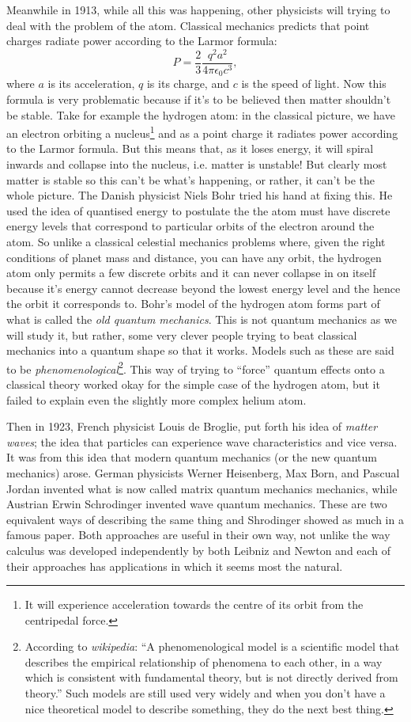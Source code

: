 \documentclass{article}
\begin{document}
Meanwhile in 1913, while all this was happening, other physicists will trying to deal with the problem of the atom. Classical mechanics predicts that point charges radiate power according to the Larmor formula:
\begin{equation}
P = \frac{2}{3} \frac{q^{2}a^{2}}{4\pi \epsilon_{0} c^{3}},
\end{equation}
where $a$ is its acceleration, $q$ is its charge, and $c$ is the speed of light. Now this formula is very problematic because if it's to be believed then matter shouldn't be stable. Take for example the hydrogen atom: in the classical picture, we have an electron orbiting a nucleus\footnote{It will experience acceleration towards the centre of its orbit from the centripedal force.} and as a point charge it radiates power according to the Larmor formula. But this means that, as it loses energy, it will spiral inwards and collapse into the nucleus, i.e. matter is unstable! But clearly most matter is stable so this can't be what's happening, or rather, it can't be the whole picture. The Danish physicist Niels Bohr tried his hand at fixing this. He used the idea of quantised energy to postulate the the atom must have discrete energy levels that correspond to particular orbits of the electron around the atom. So unlike a classical celestial mechanics problems where, given the right conditions of planet mass and distance, you can have any orbit, the hydrogen atom only permits a few discrete orbits and it can never collapse in on itself because it's energy cannot decrease beyond the lowest energy level and the hence the orbit it corresponds to. Bohr's model of the hydrogen atom forms part of what is called the \emph{old quantum mechanics}. This is not quantum mechanics as we will study it, but rather, some very clever people trying to beat classical mechanics into a quantum shape so that it works. Models such as these are said to be \emph{phenomenological}\footnote{According to \emph{wikipedia}: ``A phenomenological model is a scientific model that describes the empirical relationship of phenomena to each other, in a way which is consistent with fundamental theory, but is not directly derived from theory.'' Such models are still used very widely and when you don't have a nice theoretical model to describe something, they do the next best thing.}. This way of trying to ``force'' quantum effects onto a classical theory worked okay for the simple case of the hydrogen atom, but it failed to explain even the slightly more complex helium atom.

Then in 1923, French physicist Louis de Broglie, put forth his idea of \emph{matter waves}; the idea that particles can experience wave characteristics and vice versa. It was from this idea that modern quantum mechanics (or the new quantum mechanics) arose. German physicists  Werner Heisenberg, Max Born, and Pascual Jordan invented what is now called matrix quantum mechanics mechanics, while Austrian Erwin Schrodinger invented wave quantum mechanics. These are two equivalent ways of describing the same thing and Shrodinger showed as much in a famous paper. Both approaches are useful in their own way, not unlike the way calculus was developed independently by both Leibniz and Newton and each of their approaches has applications in which it seems most the natural.
\end{document}
